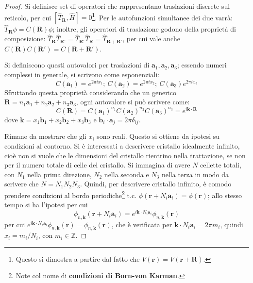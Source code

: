 \documentclass[10pt, a4paper]{scrartcl}
\numberwithin{equation}{subsection}
\theoremstyle{style1}
\begin{document}
\begin{proof}
	Si  definisce set di operatori che rappresentano traslazioni discrete sul reticolo, per cui $[\hat{T}_\mathbf{R} , \hat{H}] = 0$\footnote{Questo si dimostra a partire dal fatto che $V(\mathbf{r} ) = V(\mathbf{r} +\mathbf{R} )$.}. Per le autofunzioni simultanee dei due varr\`a: $\hat{T}_\mathbf{R} \phi  = C(\mathbf{R} ) \phi $; inoltre, gli operatori di traslazione godono della propriet\`a di composizione: $\hat{T}_\mathbf{R} \hat{T}_{\mathbf{R}'}  = \hat{T}_{\mathbf{R} '}  \hat{T}_\mathbf{R} = \hat{T}_{\mathbf{R} + \mathbf{R} '} $, per cui vale anche $C(\mathbf{R} ) C(\mathbf{R} ') = C(\mathbf{R} +\mathbf{R} ')$. 

	Si definiscono questi autovalori per traslazioni di $\mathbf{a} _1, \mathbf{a} _2, \mathbf{a}_3 $; essendo numeri complessi in generale, si scrivono come esponenziali:
	\[
	C(\mathbf{a} _1) = e^{2\pi i x_1} ; \ C(\mathbf{a} _2) = e^{2\pi i x_2} ; \ C(\mathbf{a} _3) e^{2\pi i x_3} 
	\] 
	Sfruttando questa propriet\`a considerando che un generico $\mathbf{R} = n_1 \mathbf{a} _1 + n_2 \mathbf{a} _2 + n_3 \mathbf{a}_3 $, ogni autovalore si pu\`o scrivere come:
	\begin{equation}
		C( \mathbf{R} ) = C( \mathbf{a} _1) ^{n_1} C(\mathbf{a} _2)^{n_2} C(\mathbf{a} _3) ^{n_3} = e^{ i \mathbf{k} \cdot \mathbf{R} } 
	\end{equation}
dove $\mathbf{k} = x_1 \mathbf{b} _1 + x_2 \mathbf{b} _2  + x_3 \mathbf{b} _3$ e $\mathbf{b} _i \cdot \mathbf{a}_j = 2\pi \delta _{ij} $. 

Rimane da mostrare che gli $x_i$ sono reali. 
Questo si ottiene da ipotesi su condizioni al contorno. Si \`e interessati a descrivere cristallo idealmente infinito, cio\`e non si vuole che le dimensioni del cristallo rientrino nella trattazione, se non per il numero totale di celle del cristallo. Si immagina di avere $N$ cellette totali, con $N_1$ nella prima direzione, $N_2$ nella seconda e $N_3$ nella terza in modo da scrivere che $N = N_1N_2N_3$. Quindi, per descrivere cristallo infinito, \`e comodo prendere condizioni al bordo periodiche\footnote{Note col nome di \textbf{condizioni di Born-von Karman}.} t.c. $\phi (\mathbf{r} + N_i \mathbf{a}_i) = \phi (\mathbf{r} ) $; allo stesso tempo si ha l'ipotesi per cui
\[
\phi _{n, \mathbf{k} } (\mathbf{r} + N_i \mathbf{a} _i) = e^{i \mathbf{k} \cdot N_i \mathbf{a} _i} \phi _{n , \mathbf{k} } (\mathbf{r} )
\] 
per cui $e^{i \mathbf{k} \cdot N_i \mathbf{a}_i } \phi _{n, \mathbf{k} } (\mathbf{r} ) = \phi _{n , \mathbf{k} } (\mathbf{r} )$, che \`e verificata per $\mathbf{k} \cdot N_i \mathbf{a} _i = 2\pi m_i $, quindi $x_i = m_i /  N_i$, con $m_i\in \mathbb{Z}$.
\end{proof}
\end{document}
